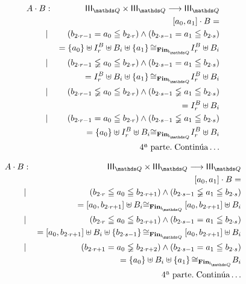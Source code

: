 \documentclass[final,12pt,a4paper,twoside,fleqn]{extbook}
\newcommand{\fromto}{\ensuremath{\longrightarrow}}
\newcommand{\set}[1]{\ensuremath{\left\lbrace{#1}\right\rbrace}}
\theoremstyle{definition}
\theoremstyle{remark}
\begin{document}
\begin{eqnarray}
A \cdot B &:& \IIIQ \times \IIIQ \fromto \IIIQ\\
&&\left[a_0,a_1\right] \cdot B =\\
&|&{\left(b_{2\cdot r-1} = a_0 \leqq b_{2\cdot
r}\right)}\land{\left(b_{2\cdot s-1} = a_1 \leqq b_{2\cdot
s}\right)}\\
\qquad&&= \set{a_0} \uplus I_r^B \uplus B_i \uplus \set{a_1}
{\cong}_{\mathbf{Fin}_{\IQ}} I_r^B \uplus B_i\\
&|&{\left(b_{2\cdot r-1} \lneqq a_0 \leqq b_{2\cdot
r}\right)}\land{\left(b_{2\cdot s-1} = a_1 \leqq b_{2\cdot
s}\right)}\\
\qquad&&= I_r^B \uplus B_i \uplus \set{a_1}
{\cong}_{\mathbf{Fin}_{\IQ}} I_r^B \uplus B_i\\
&|&{\left(b_{2\cdot r-1} \lneqq a_0 \leqq b_{2\cdot
r}\right)}\land{\left(b_{2\cdot s-1} \lneqq a_1 \leqq b_{2\cdot
s}\right)}\\
\qquad&&= I_r^B \uplus B_i\\
&|&{\left(b_{2\cdot r-1} = a_0 \leqq b_{2\cdot
r}\right)}\land{\left(b_{2\cdot s-1} \lneqq a_1 \leqq b_{2\cdot
s}\right)}\\
\qquad&&= \set{a_0} \uplus I_r^B \uplus B_i {\cong}_{\mathbf{Fin}_{\IQ}}
I_r^B \uplus B_i \\  \nonumber
&&\text{4ª parte.}\;\text{Continúa}\ldots
\end{eqnarray}



\begin{eqnarray}
A \cdot B &:& \IIIQ \times \IIIQ \fromto \IIIQ\\
&&\left[a_0,a_1\right] \cdot B =\\
&|&{\left(b_{2\cdot r} \leqq a_0 \leqq b_{2\cdot
r + 1}\right)}\land{\left(b_{2\cdot s-1} \lneqq a_1 \leqq b_{2\cdot
s}\right)}\\
\qquad&&= \left[a_0,b_{2\cdot r + 1}\right] \uplus B_i
{\cong}_{\mathbf{Fin}_{\IQ}}
\left[a_0,b_{2\cdot r + 1}\right] \uplus B_i\\
&|&{\left(b_{2\cdot r} \leqq a_0 \leqq b_{2\cdot
r + 1}\right)}\land{\left(b_{2\cdot s-1} = a_1 \leqq b_{2\cdot
s}\right)}\\
\qquad&&= \left[a_0,b_{2\cdot r + 1}\right] \uplus B_i \uplus \set{b_{2\cdot
s-1}} {\cong}_{\mathbf{Fin}_{\IQ}} \left[a_0,b_{2\cdot r + 1}\right] \uplus
B_i\\
&|&{\left(b_{2\cdot r + 1} = a_0 \lneqq b_{2\cdot
r + 2}\right)}\land{\left(b_{2\cdot s-1} = a_1 \leqq b_{2\cdot
s}\right)}\\
\qquad&&= \set{a_0} \uplus B_i \uplus \set{a_1} {\cong}_{\mathbf{Fin}_{\IQ}}
B_i \\ \nonumber
&&\text{4ª parte.}\;\text{Continúa}\ldots
\end{eqnarray}
\end{document}
